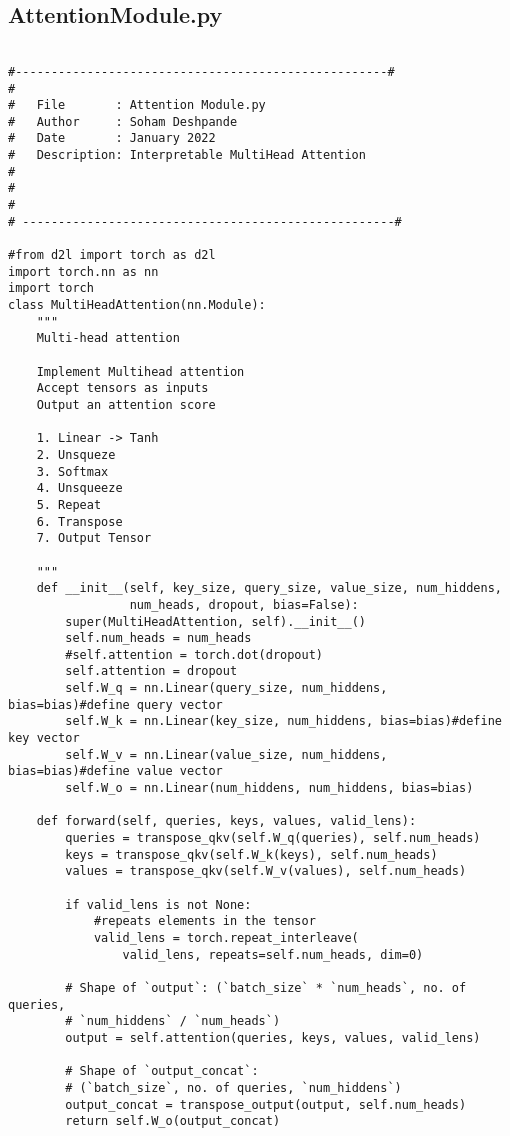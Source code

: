 \documentclass{article}
\begin{document}
\subsection{AttentionModule.py}
\begin{lstlisting}

#----------------------------------------------------#
#
#   File       : Attention Module.py
#   Author     : Soham Deshpande
#   Date       : January 2022
#   Description: Interpretable MultiHead Attention
#
#
#
# ----------------------------------------------------#

#from d2l import torch as d2l
import torch.nn as nn
import torch
class MultiHeadAttention(nn.Module):
    """
    Multi-head attention

    Implement Multihead attention
    Accept tensors as inputs
    Output an attention score

    1. Linear -> Tanh
    2. Unsqueze
    3. Softmax
    4. Unsqueeze
    5. Repeat
    6. Transpose
    7. Output Tensor

    """
    def __init__(self, key_size, query_size, value_size, num_hiddens,
                 num_heads, dropout, bias=False):
        super(MultiHeadAttention, self).__init__()
        self.num_heads = num_heads
        #self.attention = torch.dot(dropout)
        self.attention = dropout
        self.W_q = nn.Linear(query_size, num_hiddens, bias=bias)#define query vector
        self.W_k = nn.Linear(key_size, num_hiddens, bias=bias)#define key vector
        self.W_v = nn.Linear(value_size, num_hiddens, bias=bias)#define value vector
        self.W_o = nn.Linear(num_hiddens, num_hiddens, bias=bias)

    def forward(self, queries, keys, values, valid_lens):
        queries = transpose_qkv(self.W_q(queries), self.num_heads)
        keys = transpose_qkv(self.W_k(keys), self.num_heads)
        values = transpose_qkv(self.W_v(values), self.num_heads)

        if valid_lens is not None:
            #repeats elements in the tensor
            valid_lens = torch.repeat_interleave(
                valid_lens, repeats=self.num_heads, dim=0)

        # Shape of `output`: (`batch_size` * `num_heads`, no. of queries,
        # `num_hiddens` / `num_heads`)
        output = self.attention(queries, keys, values, valid_lens)

        # Shape of `output_concat`:
        # (`batch_size`, no. of queries, `num_hiddens`)
        output_concat = transpose_output(output, self.num_heads)
        return self.W_o(output_concat)



\end{lstlisting}
\end{document}
